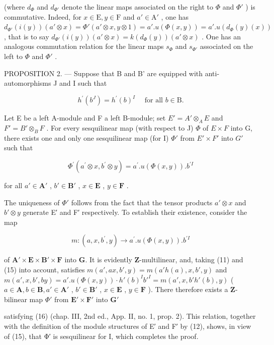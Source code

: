 (where \(d_{\Phi}\) and \(d_{\Phi'}\) denote the linear maps associated on the right to \(\Phi\) and \(\Phi'\) ) is commutative. Indeed, for \(x \in \mathrm{E}, y \in \mathrm{F}\) and \(a' \in \mathrm{A}'\) , one has \(d_{\Phi'}(i(y))(a' \otimes x) = \Phi'(a' \otimes x, y \otimes 1) = a'. u(\Phi(x, y)) = a'. u(d_{\Phi}(y)(x))\) , that is to say \(d_{\Phi'}(i(y))(a' \otimes x) = k(d_{\Phi}(y))(a' \otimes x)\) . One has an analogous commutation relation for the linear maps \(s_{\Phi}\) and \(s_{\Phi'}\) associated on the left to \(\Phi\) and \(\Phi'\) .

PROPOSITION 2. --- Suppose that B and B' are equipped with anti-automorphisms J and I such that

\[
h ^ {\prime} (b ^ {J}) = h ^ {\prime} (b) ^ {I} \quad \text { for all } b \in \mathrm{B}.\tag{15}
\]

Let E be a left A-module and F a left B-module; set \(E' = A' \otimes_{A} E\) and \(F' = B' \otimes_{B} F\) . For every sesquilinear map (with respect to J) \(\Phi\) of \(E \times F\) into G, there exists one and only one sesquilinear map (for I) \(\Phi'\) from \(E' \times F'\) into \(G'\) such that

\[
\Phi^ {\prime} (a ^ {\prime} \otimes x, b ^ {\prime} \otimes y) = a ^ {\prime}. u (\Phi (x, y)). b ^ {\prime I}\tag{16}
\]

for all \(a' \in \mathbf{A}'\) , \(b' \in \mathbf{B}'\) , \(x \in \mathbf{E}\) , \(y \in \mathbf{F}\) .

The uniqueness of \(\Phi'\) follows from the fact that the tensor products \(a' \otimes x\) and \(b' \otimes y\) generate E′ and F′ respectively. To establish their existence, consider the map

\[
m: (a, x, b ^ {\prime}, y) \rightarrow a ^ {\prime}. u (\Phi (x, y)). b ^ {\prime I}
\]

of \(\mathbf{A}' \times \mathbf{E} \times \mathbf{B}' \times \mathbf{F}\) into \(\mathbf{G}\). It is evidently \(\mathbf{Z}\)-multilinear, and, taking (11) and (15) into account, satisfies \(m(a', ax, b', y) = m(a'h(a), x, b', y)\) and \(m(a', x, b', by) = a'. u(\Phi(x, y)) \cdot h'(b)^{I} b'^{I} = m(a', x, b'h'(b), y)\) ( \(a \in \mathbf{A}, b \in \mathbf{B}, a' \in \mathbf{A}'\) , \(b' \in \mathbf{B}'\) , \(x \in \mathbf{E}\) , \(y \in \mathbf{F}\) ). There therefore exists a \(\mathbf{Z}\)-bilinear map \(\Phi'\) from \(\mathbf{E}' \times \mathbf{F}'\) into \(\mathbf{G}'\)

satisfying (16) (chap. III, 2nd ed., App. II, no. 1, prop. 2). This relation, together with the definition of the module structures of E′ and F′ by (12), shows, in view of (15), that Φ′ is sesquilinear for I, which completes the proof.

